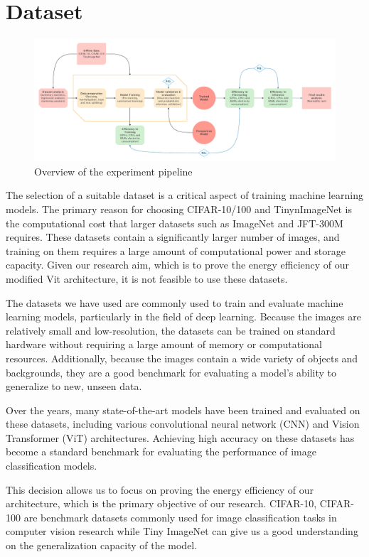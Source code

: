 \section{Dataset}
\label{dataset}
\begin{figure}[!h]
  \includegraphics[width=\textwidth]{images/pipeline_final.pdf}
  \caption{Overview of the experiment pipeline}
  \label{pipeline}
\end{figure}
The selection of a suitable dataset is a critical aspect of training machine learning models. The primary reason for choosing CIFAR-10/100 and TinynImageNet is the computational cost that larger datasets such as ImageNet and JFT-300M requires. These datasets contain a significantly larger number of images, and training on them requires a large amount of computational power and storage capacity. Given our research aim, which is to prove the energy efficiency of our modified Vit architecture, it is not feasible to use these datasets.

The datasets we have used are commonly used to train and evaluate machine learning models, particularly in the field of deep learning. Because the images are relatively small and low-resolution, the datasets can be trained on standard hardware without requiring a large amount of memory or computational resources. Additionally, because the images contain a wide variety of objects and backgrounds, they are a good benchmark for evaluating a model's ability to generalize to new, unseen data.

Over the years, many state-of-the-art models have been trained and evaluated on these datasets, including various convolutional neural network (CNN) and Vision Transformer (ViT) architectures. Achieving high accuracy on these datasets has become a standard benchmark for evaluating the performance of image classification models.

This decision allows us to focus on proving the energy efficiency of our architecture, which is the primary objective of our research.
CIFAR-10, CIFAR-100 are benchmark datasets commonly used for image classification tasks in computer vision research while Tiny ImageNet can give us a good understanding on the generalization capacity of the model. 

